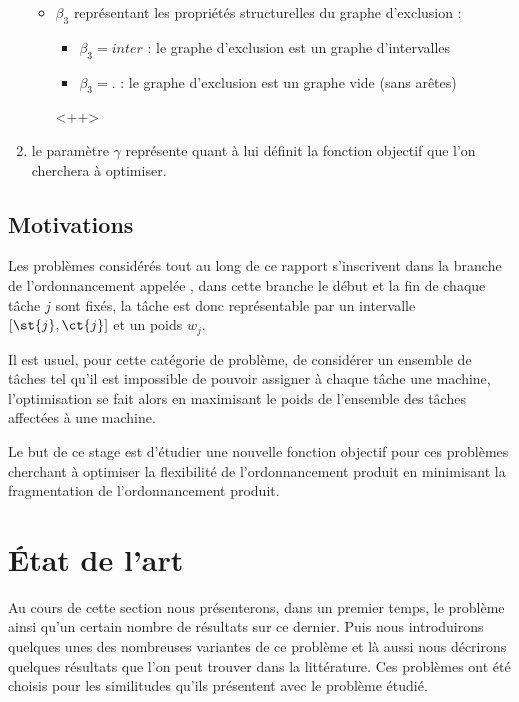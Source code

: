 \documentclass[a4paper,11pt]{article}
\begin{document}
\begin{enumerate}
\begin{itemize}[label=$\bullet$]
\begin{itemize}
                \end{itemize}
            \item $\beta_3$ représentant les propriétés structurelles du graphe d'exclusion :
                \begin{itemize}
                    \item $\beta_3 = inter$ : le graphe d'exclusion est un graphe d'intervalles
                    \item $\beta_3 = .$ : le graphe d'exclusion est un graphe vide (sans arêtes)
                \end{itemize}<++>
        \end{itemize}
    \item le paramètre $\gamma$ représente quant à lui définit la fonction objectif que l'on
        cherchera à optimiser.
\end{enumerate}

\subsection{Motivations}

Les problèmes considérés tout au long de ce rapport s'inscrivent dans la branche de l'ordonnancement
appelée \isched, dans cette branche le début et la fin de chaque tâche $j$ sont
fixés, la tâche est donc représentable par un intervalle $\left[ \st{j}, \ct{j} \right]$ et un poids
$w_j$. 

Il est usuel, pour cette catégorie de problème,  de considérer un ensemble de tâches tel qu'il est
impossible de pouvoir assigner à chaque tâche une machine, l'optimisation se fait alors en
maximisant le poids de l'ensemble des tâches affectées à une machine.

Le but de ce stage est d'étudier une nouvelle fonction objectif pour ces problèmes cherchant à
optimiser la flexibilité de l'ordonnancement produit en minimisant la fragmentation de
l'ordonnancement produit.

\section{État de l'art}

Au cours de cette section nous présenterons, dans un premier temps, le problème \bisched ainsi qu'un
certain nombre de résultats sur ce dernier. Puis nous introduirons quelques unes des nombreuses
variantes de ce problème et là aussi nous décrirons quelques résultats que l'on peut trouver dans la
littérature. Ces problèmes ont été choisis pour les similitudes qu'ils présentent avec le problème
étudié.
\end{document}
